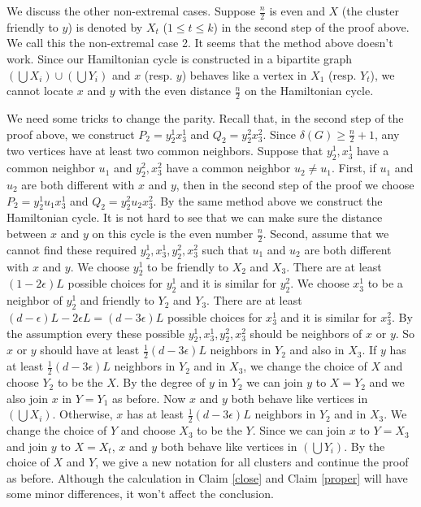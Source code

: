 \documentclass[11pt]{article}
\begin{document}
We discuss the other non-extremal cases. Suppose $\frac{n}{2}$ is even and $X$ (the cluster friendly to $y$) is denoted by $X_t$ ($1\leq t\leq k$) in the second step of the proof above. We call this the non-extremal case 2. It seems that the method above doesn't work. Since our Hamiltonian cycle is constructed in a bipartite graph $(\bigcup X_i)\cup (\bigcup Y_i)$ and $x$ (resp. $y$) behaves like a vertex in $X_1$ (resp. $Y_t$), we cannot locate $x$ and $y$ with the even distance $\frac{n}{2}$ on the Hamiltonian cycle.

We need some tricks to change the parity. Recall that, in the second step of the proof above, we construct $P_2=y_2^1x_3^1$ and $Q_2=y_2^2x_3^2$. Since $\delta (G)\geq \frac{n}{2}+1$, any two vertices have at least two common neighbors. Suppose that $y_2^1,x_3^1$ have a common neighbor $u_1$ and $y_2^2,x_3^2$ have a common neighbor $u_2\not =u_1$. First, if $u_1$ and $u_2$ are both different with $x$ and $y$, then in the second step of the proof we choose $P_2=y_2^1u_1x_3^1$ and $Q_2=y_2^2u_2x_3^2$. By the same method above we construct the Hamiltonian cycle. It is not hard to see that we can make sure the distance between $x$ and $y$ on this cycle is the even number $\frac{n}{2}$. Second, assume that we cannot find these required $y_2^1, x_3^1, y_2^2, x_3^2$ such that $u_1$ and $u_2$ are both different with $x$ and $y$. We choose $y_2^1$ to be friendly to $X_2$ and $X_3$. There are at least $(1-2\epsilon )L$ possible choices for $y_2^1$ and it is similar for $y_2^2$. We choose $x_3^1$ to be a neighbor of $y_2^1$ and friendly to $Y_2$ and $Y_3$. There are at least $(d-\epsilon )L-2\epsilon L=(d-3\epsilon )L$ possible choices for $x_3^1$ and it is similar for $x_3^2$. By the assumption every these possible $y_2^1, x_3^1, y_2^2, x_3^2$ should be neighbors of $x$ or $y$. So $x$ or $y$ should have at least $\frac{1}{2}(d-3\epsilon )L$ neighbors in $Y_2$ and also in $X_3$. If $y$ has at least $\frac{1}{2}(d-3\epsilon )L$ neighbors in $Y_2$ and in $X_3$, we change the choice of $X$ and choose $Y_2$ to be the $X$. By the degree of $y$ in $Y_2$ we can join $y$ to $X=Y_2$ and we also join $x$ in $Y=Y_1$ as before. Now $x$ and $y$ both behave like vertices in $(\bigcup X_i)$. Otherwise, $x$ has at least $\frac{1}{2}(d-3\epsilon )L$ neighbors in $Y_2$ and in $X_3$. We change the choice of $Y$ and choose $X_3$ to be the $Y$. Since we can join $x$ to $Y=X_3$ and join $y$ to $X=X_t$, $x$ and $y$ both behave like vertices in $(\bigcup Y_i)$. By the choice of $X$ and $Y$, we give a new notation for all clusters and continue the proof as before. Although the calculation in Claim \ref{close} and Claim \ref{proper} will have some minor differences, it won't affect the conclusion.
\end{document}
